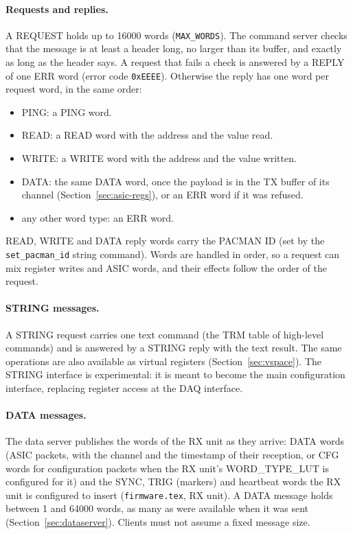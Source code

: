 \documentclass[12pt]{article}
\newcommand{\hex}[1]{\texttt{0x#1}}
\newcommand{\f}[1]{\texttt{#1}}
\begin{document}
\paragraph{Requests and replies.}  A REQUEST holds up to 16000 words (\f{MAX\_WORDS}).  The command
server checks that the message is at least a header long, no larger than its buffer, and exactly as
long as the header says.  A request that fails a check is answered by a REPLY of one ERR word (error
code \hex{EEEE}).  Otherwise the reply has one word per request word, in the same order:
\begin{itemize}
\item PING:  a PING word.
\item READ:  a READ word with the address and the value read.
\item WRITE:  a WRITE word with the address and the value written.
\item DATA:  the same DATA word, once the payload is in the TX buffer of its channel
  (Section~\ref{sec:asic-regs}), or an ERR word if it was refused.
\item any other word type:  an ERR word.
\end{itemize}
READ, WRITE and DATA reply words carry the PACMAN ID (set by the \f{set\_pacman\_id} string command).
Words are handled in order, so a request can mix register writes and ASIC words, and their effects
follow the order of the request.

\paragraph{STRING messages.}  A STRING request carries one text command (the TRM table of high-level
commands) and is answered by a STRING reply with the text result.  The same operations are also
available as virtual registers (Section~\ref{sec:vspace}).  The STRING interface is experimental:
it is meant to become the main configuration interface, replacing register access at the DAQ
interface.

\paragraph{DATA messages.}  The data server publishes the words of the RX unit as they arrive:  DATA
words (ASIC packets, with the channel and the timestamp of their reception, or CFG words for
configuration packets when the RX unit's WORD\_TYPE\_LUT is configured for it) and the SYNC, TRIG
(markers) and heartbeat words the RX unit is configured to insert (\f{firmware.tex}, RX unit).  A
DATA message holds between 1 and 64000 words, as many as were available when it was sent
(Section~\ref{sec:dataserver}).  Clients must not assume a fixed message size.
\end{document}
